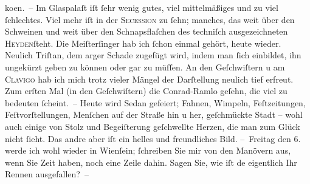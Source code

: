 \begin{ledgroupsized}[t]{13cm}
                        ko{\geminationm}en. – Im Glaspalaſt iſt ſehr wenig gutes, viel mittelmäßiges und zu viel
                    ſchlechtes. Viel mehr iſt in der \textsc{Secession} zu ſehn; manches, das weit über den Schweinen und weit über den
                    Schnapsflaſchen des techniſch ausgezeichneten \textsc{Heyden}ſteht. Die Meiſterſinger hab ich ſchon einmal gehört, heute wieder. Neulich Triſtan, dem arger Schade zugefügt wird, indem
                    man ſich einbildet, ihn ungekürzt geben zu können oder gar zu müſſen. An den Geſchwiſtern u am \textsc{Clavigo} hab ich mich trotz vieler Mängel der Darſtellung {\pb}neulich tief erfreut. Zum erſten Mal (in den Geſchwiſtern) die Conrad-Ramlo geſehn, die viel zu bedeuten ſcheint. –
                    Heute wird Sedan gefeiert; Fahnen, Wimpeln,
                    Feſtzeitungen, Feſtvorſtellungen, Menſchen auf der Straße hin u her, geſchmückte
                    Stadt – wohl auch einige von Stolz und Begeiſterung geſchwellte Herzen, die man
                    zum Glück nicht ſieht. Das andre aber iſt ein helles und freundliches Bild.\pend
           \pstart
           – Freitag den 6. werde ich wohl wieder in Wienſein; ſchreiben Sie mir von den Manövern aus,
                    wenn Sie Zeit haben, noch eine Zeile dahin. Sagen Sie, wie iſt de{\geminationn} eigentlich {\pb}Ihr
                    Rennen ausgefallen? –\pend

\end{ledgroupsized}
